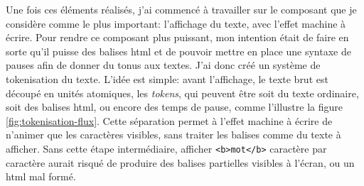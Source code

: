 Une fois ces éléments réalisés, j'ai commencé à travailler sur le composant que je considère comme le plus important: l'affichage du texte, avec l'effet machine à écrire. Pour rendre ce composant plus puissant, mon intention était de faire en sorte qu'il puisse  des balises \acrshort{html} et de pouvoir mettre en place une \gls{syntaxe} de pauses afin de donner du tonus aux textes. J'ai donc créé un système de \gls{tokenisation} du texte. L'idée est simple: avant l'affichage, le texte brut est découpé en unités atomiques, les \textit{tokens}, qui peuvent être soit du texte ordinaire, soit des balises \acrshort{html}, ou encore des temps de pause, comme l'illustre la figure \ref{fig:tokenisation-flux}. Cette séparation permet à l'effet machine à écrire de n'animer que les caractères visibles, sans traiter les balises comme du texte à afficher. Sans cette étape intermédiaire, afficher \texttt{<b>mot</b>} caractère par caractère aurait risqué de produire des balises partielles visibles à l'écran, ou un \acrshort{html} mal formé.

